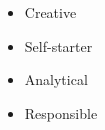 %
%
%

\twocolumnsection
{
\begin{skills}
\end{skills}}
{
\vspace{1em}
\begin{itemize}
    \item Creative
    \item Self-starter
    \item Analytical
    \item Responsible
\end{itemize}
}
